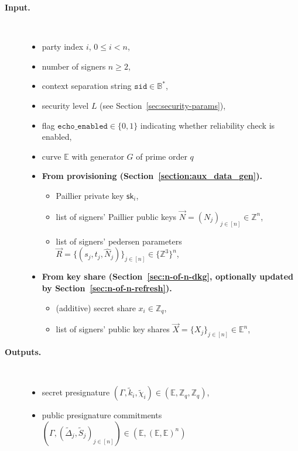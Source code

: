\documentclass[11pt]{article}
\newcommand{\sid}{\ensuremath{\mathtt{sid}}}
\newcommand{\var}[1]{\ensuremath{\mathtt{#1}}}
\newcommand{\sk}{\textsf{sk}}
\newcommand{\E}{\mathbb{E}}
\newcommand{\Z}{\mathbb{Z}}
\newcommand{\?}[1]{\stackrel{?}{#1}}
\newcommand{\Bit}{\ensuremath{\{0{,}1\}}}
\newcommand{\Byte}{\ensuremath{\mathbb{B}}}
\begin{document}
\begin{description}
    \item[\bf Input.] \
    \begin{itemize}[noitemsep,topsep=0pt]
    \item party index $i$, $0 \le i < n$,
    \item number of signers $n \ge 2$,
    \item context separation string $\sid \in \Byte^*$,
    \item security level $L$ (see Section~\ref{sec:security-params}),
    \item flag $\var{echo\_enabled} \in \Bit$ indicating whether reliability check is enabled,
    \item curve $\E$ with generator $G$ of prime order $q$
    \item[] \textbf{From provisioning (Section~\ref{section:aux_data_gen}).}
    \begin{itemize}[noitemsep,topsep=0pt]
    \item Paillier private key $\sk_i$,
    \item list of signers' Paillier public keys $\vec N = (N_j)_{j\in[n]} \in \Z^n$,
    \item list of signers' pedersen parameters $\vec R = \{(s_j, t_j, \hat N_j)\}_{j\in[n]} \in \{\Z^3\}^n$,
    \end{itemize}
    \item[] \textbf{From key share (Section~\ref{sec:n-of-n-dkg}, optionally updated by Section~\ref{sec:n-of-n-refresh}).}
    \begin{itemize}[noitemsep,topsep=0pt]
    \item (additive) secret share $x_i \in \Z_q$,
    \item list of signers' public key shares $\vec X = \{X_j\}_{j\in[n]} \in \E^n$,
    \end{itemize}
    \end{itemize}

    \item[\bf Outputs.] \
    \begin{itemize}[noitemsep,topsep=0pt]
    \item secret presignature $(\Gamma, \tilde k_i, \tilde \chi_i) \in (\E, \Z_q, \Z_q)$,
    \item public presignature commitments $(\Gamma, (\tilde \Delta_j, \tilde S_j)_{j\in[n]}) \in (\E, (\E, \E)^n)$
    \end{itemize}


\end{description}
\end{document}

